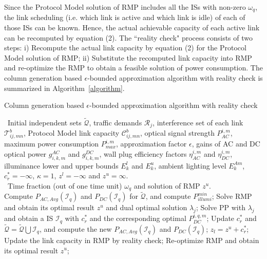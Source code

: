 \documentclass[10pt,journal]{IEEEtran}
\begin{document}
Since the Protocol Model solution of RMP includes all the ISs with non-zero $\omega_{q}$, the link scheduling (i.e. which link is active and which link is idle) of each of those ISs can be known. Hence, the actual achievable capacity of each active link can be recomputed by equation (2). The ``reality check" process consists of two steps: i) Recompute the actual link capacity by equation (2) for the Protocol Model solution of RMP; ii) Substitute the recomputed link capacity into RMP and re-optimize the RMP to obtain a feasible solution of power consumption. The column generation based $\epsilon$-bounded approximation algorithm with reality check is summarized in Algorithm~\ref{algorithm}.


\begin{algorithm}
\caption{Column generation based $\epsilon$-bounded approximation algorithm with reality check}\label{algorithm}
\begin{algorithmic}[1]
\REQUIRE~Initial independent sets $\tilde{\mathcal{Q}}$, traffic demands $\mathcal{R}_{j}$, interference set of each link $\mathcal{T}^{b}_{ij,mn}$, Protocol Model link capacity $\mathcal{C}^{b}_{ij,mn}$, optical signal strength $P_{AC}^{i,m}$, maximum power consumption $P_{max}^{i,m}$, approximation factor $\epsilon$, gains of AC and DC optical power $g^{AC}_{i,k,m}$ and $g^{DC}_{i,k,m}$, wall plug efficiency factors $\eta_{AC}^{i,m}$ and $\eta_{DC}^{i,m}$, illuminance lower and upper bounds $E_{k}^{l}$ and $E_{k}^{u}$, ambient lighting level $E_{k}^{Am}$, $c_{r}^{\ast}=-\infty$, $\kappa=1$, $z^{l}=-\infty$ and $z^{u}=\infty$.\\
\ENSURE~Time fraction (out of one time unit) $\omega_{q}$ and solution of RMP $z^{u}$.\\
\STATE Compute $P_{AC,Avg}(\mathcal{I}_{q})$ and $P_{DC}(\mathcal{I}_{q})$ for $\tilde{\mathcal{Q}}$, and compute $P_{illumi}^{min}$;
\STATE Solve RMP and obtain its optimal result $z^{u}$ and dual optimal solution $\lambda_{j}$;
\STATE Solve PP with $\lambda_{j}$ and obtain a IS $\mathcal{I}_{q}$ with $c_{r}^{\ast}$ and the corresponding optimal $P_{DC}^{i,q,m}$;
\STATE Update $c_{r}^{\ast}$ and $\tilde{\mathcal{Q}}=\tilde{\mathcal{Q}}\bigcup\mathcal{I}_{q}$, and compute the new $P_{AC,Avg}(\mathcal{I}_{q})$ and $P_{DC}(\mathcal{I}_{q})$;
\STATE $z_{l}=z^{u}+c_{r}^{\ast}$;
\ENDWHILE
\STATE Update the link capacity in RMP by reality check;
\STATE Re-optimize RMP and obtain its optimal result $z^{u}$;
\end{algorithmic}
\end{algorithm}
\end{document}
